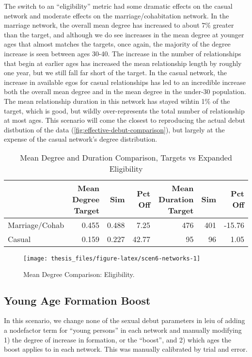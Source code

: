 \documentclass [11pt, proquest] {uwthesis}[2015/03/03]
\begin{document}
The switch to an ``eligibility'' metric had some dramatic effects on the
casual network and moderate effects on the marriage/cohabitation
network. In the marriage network, the overall mean degree has increased
to about 7\% greater than the target, and although we do see increases
in the mean degree at younger ages that almost matches the targets, once
again, the majority of the degree increase is seen between ages 30-40.
The increase in the number of relationships that begin at earlier ages
has increased the mean relationship length by roughly one year, but we
still fall far short of the target. In the casual network, the increase
in available egos for casual relationships has led to an incredible
increase both the overall mean degree and in the mean degree in the
under-30 population. The mean relationship duration in this network has
stayed wihtin 1\% of the target, which is good, but wildly
over-represents the total number of relationship at most ages. This
scenario will come the closest to reproducing the actual debut
distbution of the data (\ref{fig:effective-debut-comparison}), but
largely at the expense of the casual network's degree distribution.
\begin{table}

\caption{\label{tab:scen6-tab}Mean Degree and Duration Comparison, Targets vs Expanded Eligibility}
\centering
\begin{tabular}[t]{lrrrrrr}
\toprule
  & Mean Degree Target & Sim & Pct Off & Mean Duration Target & Sim & Pct Off\\
\midrule
Marriage/Cohab & 0.455 & 0.488 & 7.25 & 476 & 401 & -15.76\\
Casual & 0.159 & 0.227 & 42.77 & 95 & 96 & 1.05\\
\bottomrule
\end{tabular}
\end{table}
\begin{figure}

{\centering \texttt{[image: thesis\_files/figure-latex/scen6-networks-1]} 

}

\caption{Mean Degree Comparison: Eligibility.}\label{fig:scen6-networks}
\end{figure}
\subsection{Young Age Formation Boost}\label{young-age-formation-boost}

In this scenario, we change none of the sexual debut parameters in leiu
of adding a nodefactor term for ``young persons'' in each network and
manually modifying 1) the degree of increase in formation, or the
``boost'', and 2) which ages the boost applies to in each network. This
was manually calibrated by trial and error.
\end{document}
